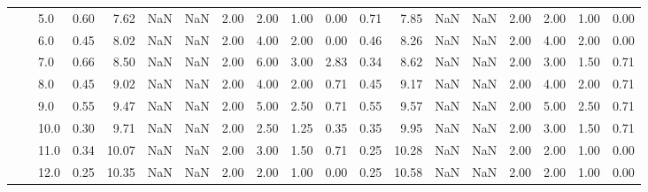 \begin{tabular}{lllrrrrrrrrrrrrrrrr}
       &     & 5.0  &      0.60 &       7.62 &               NaN &                NaN & 2.00 &   2.00 &             1.00 &                         0.00 &      0.71 &       7.85 &               NaN &                NaN & 2.00 &   2.00 &             1.00 &                         0.00 \\
       &     & 6.0  &      0.45 &       8.02 &               NaN &                NaN & 2.00 &   4.00 &             2.00 &                         0.00 &      0.46 &       8.26 &               NaN &                NaN & 2.00 &   4.00 &             2.00 &                         0.00 \\
       &     & 7.0  &      0.66 &       8.50 &               NaN &                NaN & 2.00 &   6.00 &             3.00 &                         2.83 &      0.34 &       8.62 &               NaN &                NaN & 2.00 &   3.00 &             1.50 &                         0.71 \\
       &     & 8.0  &      0.45 &       9.02 &               NaN &                NaN & 2.00 &   4.00 &             2.00 &                         0.71 &      0.45 &       9.17 &               NaN &                NaN & 2.00 &   4.00 &             2.00 &                         0.71 \\
       &     & 9.0  &      0.55 &       9.47 &               NaN &                NaN & 2.00 &   5.00 &             2.50 &                         0.71 &      0.55 &       9.57 &               NaN &                NaN & 2.00 &   5.00 &             2.50 &                         0.71 \\
       &     & 10.0 &      0.30 &       9.71 &               NaN &                NaN & 2.00 &   2.50 &             1.25 &                         0.35 &      0.35 &       9.95 &               NaN &                NaN & 2.00 &   3.00 &             1.50 &                         0.71 \\
       &     & 11.0 &      0.34 &      10.07 &               NaN &                NaN & 2.00 &   3.00 &             1.50 &                         0.71 &      0.25 &      10.28 &               NaN &                NaN & 2.00 &   2.00 &             1.00 &                         0.00 \\
       &     & 12.0 &      0.25 &      10.35 &               NaN &                NaN & 2.00 &   2.00 &             1.00 &                         0.00 &      0.25 &      10.58 &               NaN &                NaN & 2.00 &   2.00 &             1.00 &                         0.00 \\

\end{tabular}
